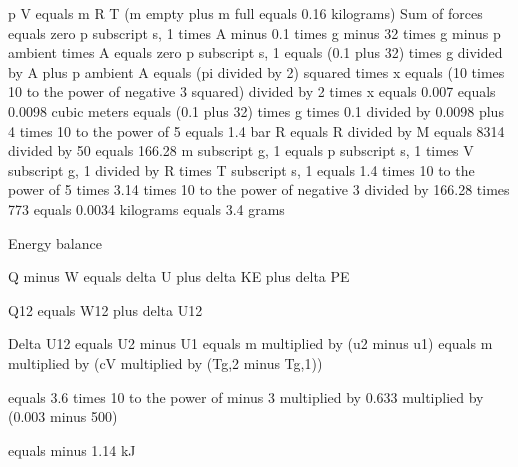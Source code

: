 p V equals m R T  
(m empty plus m full equals 0.16 kilograms)  
Sum of forces equals zero  
p subscript s, 1 times A minus 0.1 times g minus 32 times g minus p ambient times A equals zero  
p subscript s, 1 equals (0.1 plus 32) times g divided by A plus p ambient  
A equals (pi divided by 2) squared times x equals (10 times 10 to the power of negative 3 squared) divided by 2 times x equals 0.007 equals 0.0098 cubic meters  
equals (0.1 plus 32) times g times 0.1 divided by 0.0098 plus 4 times 10 to the power of 5 equals 1.4 bar  
R equals R divided by M equals 8314 divided by 50 equals 166.28  
m subscript g, 1 equals p subscript s, 1 times V subscript g, 1 divided by R times T subscript s, 1  
equals 1.4 times 10 to the power of 5 times 3.14 times 10 to the power of negative 3 divided by 166.28 times 773 equals 0.0034 kilograms equals 3.4 grams

Energy balance

Q minus W equals delta U plus delta KE plus delta PE

Q12 equals W12 plus delta U12

Delta U12 equals U2 minus U1 equals m multiplied by (u2 minus u1) equals m multiplied by (cV multiplied by (Tg,2 minus Tg,1))

equals 3.6 times 10 to the power of minus 3 multiplied by 0.633 multiplied by (0.003 minus 500)

equals minus 1.14 kJ